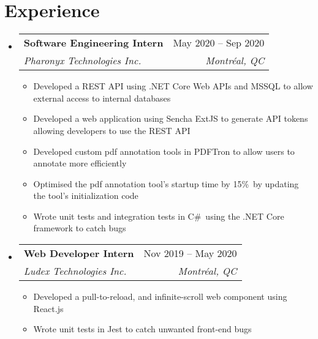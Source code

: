 \documentclass[letterpaper,11pt]{article}
\makeatletter
\newcommand{\resumeItem}[1]{
  \item\small{
    {#1 \vspace{-2pt}}
  }
}
\newcommand{\resumeSubheading}[4]{
  \vspace{-2pt}\item
    \begin{tabular*}{0.97\textwidth}[t]{l@{\extracolsep{\fill}}r}
      \textbf{#1} & #2 \\
      \textit{\small#3} & \textit{\small #4} \\
    \end{tabular*}\vspace{-7pt}
}
\newcommand{\resumeSubSubheading}[2]{
    \item
    \begin{tabular*}{0.97\textwidth}{l@{\extracolsep{\fill}}r}
      \textit{\small#1} & \textit{\small #2} \\
    \end{tabular*}\vspace{-7pt}
}
\newcommand{\resumeSubHeadingListStart}{\begin{itemize}[leftmargin=0.15in, label={}]}
\newcommand{\resumeSubHeadingListEnd}{\end{itemize}}
\newcommand{\resumeItemListStart}{\begin{itemize}}
\newcommand{\resumeItemListEnd}{\end{itemize}\vspace{-5pt}}
\makeatother
\begin{document}
\section{Experience}
  \resumeSubHeadingListStart

    \resumeSubheading
      {Software Engineering Intern}{May 2020 -- Sep 2020}
      {Pharonyx Technologies Inc.}{Montréal, QC}
      \resumeItemListStart
        \resumeItem{Developed a REST API using .NET Core Web APIs and MSSQL to allow external access to internal databases}
        \resumeItem{Developed a web application using Sencha ExtJS to generate API tokens allowing developers to use the REST API}
        \resumeItem{Developed custom pdf annotation tools in PDFTron to allow users to annotate more efficiently}
        \resumeItem{Optimised the pdf annotation tool's startup time by 15\%\ by updating the tool's initialization code}
        \resumeItem{Wrote unit tests and integration tests in C\#\ using the .NET Core framework to catch bugs}
      \resumeItemListEnd
      

    \resumeSubheading
      {Web Developer Intern}{Nov 2019 -- May 2020}
      {Ludex Technologies Inc.}{Montréal, QC}
      \resumeItemListStart
        \resumeItem{Developed a pull-to-reload, and infinite-scroll web component using React.js}
        \resumeItem{Wrote unit tests in Jest to catch unwanted front-end bugs}
    \resumeItemListEnd

  \resumeSubHeadingListEnd


\end{document}
